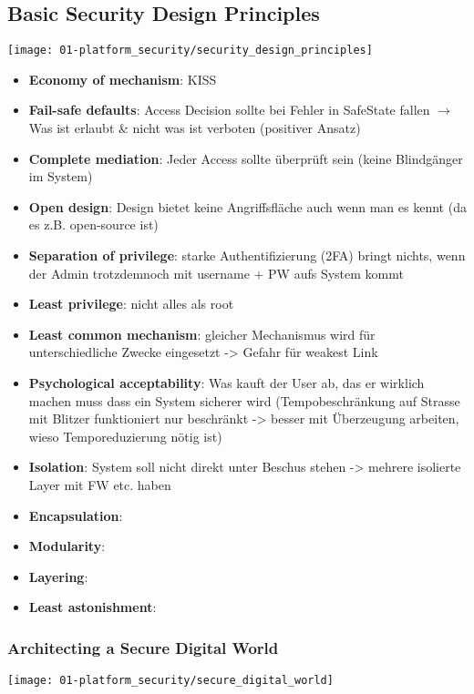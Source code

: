 \subsection{Basic Security Design Principles}
\begin{center}
    \vspace{-8pt}
    \texttt{[image: 01-platform\_security/security\_design\_principles]}
    \vspace{-8pt}
\end{center}

\begin{itemize}
    \item \textbf{Economy of mechanism}: KISS
    \item \textbf{Fail-safe defaults}: Access Decision sollte bei Fehler in Safe\-State fallen $\rightarrow$ Was ist erlaubt \& nicht was ist verboten (positiver Ansatz)
    \item \textbf{Complete mediation}: Jeder Access sollte überprüft sein (keine Blindgänger im System)
    \item \textbf{Open design}: Design bietet keine Angriffsfläche auch wenn man es kennt (da es z.B. open-source ist)
    \item \textbf{Separation of privilege}: starke Authentifizierung (2FA) bringt nichts, wenn der Admin trotzdemnoch mit username + PW aufs System kommt
    \item \textbf{Least privilege}: nicht alles als root
    \item \textbf{Least common mechanism}: gleicher Mechanismus wird für unterschiedliche Zwecke eingesetzt -> Gefahr für weakest Link
    \item \textbf{Psychological acceptability}: Was kauft der User ab, das er wirklich machen muss dass ein System sicherer wird (Tempobeschränkung auf Strasse mit Blitzer funktioniert nur beschränkt -> besser mit Überzeugung arbeiten, wieso Temporeduzierung nötig ist)
    \item \textbf{Isolation}: System soll nicht direkt unter Beschus stehen -> mehrere isolierte Layer mit FW etc. haben
    \item \textbf{Encapsulation}: \TODO
    \item \textbf{Modularity}: \TODO
    \item \textbf{Layering}: \TODO
    \item \textbf{Least astonishment}: \TODO{}
\end{itemize}

\subsubsection{Architecting a Secure Digital World}
\begin{center}
    \vspace{-8pt}
    \texttt{[image: 01-platform\_security/secure\_digital\_world]}
    \vspace{-8pt}
\end{center}

